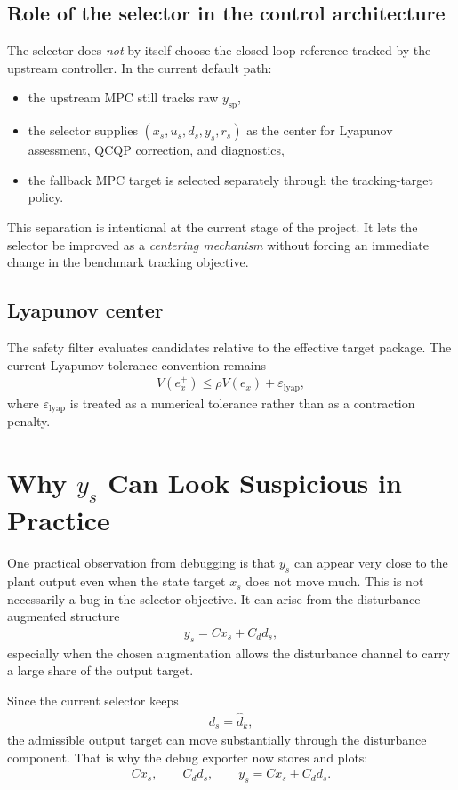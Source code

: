 \documentclass[11pt]{article}
\begin{document}
\subsection{Role of the selector in the control architecture}
The selector does \emph{not} by itself choose the closed-loop reference tracked by the upstream controller. In the current default path:
\begin{itemize}
\item the upstream MPC still tracks raw $y_{\mathrm{sp}}$,
\item the selector supplies $(x_s,u_s,d_s,y_s,r_s)$ as the center for Lyapunov assessment, QCQP correction, and diagnostics,
\item the fallback MPC target is selected separately through the tracking-target policy.
\end{itemize}

This separation is intentional at the current stage of the project. It lets the selector be improved as a \emph{centering mechanism} without forcing an immediate change in the benchmark tracking objective.

\subsection{Lyapunov center}
The safety filter evaluates candidates relative to the effective target package. The current Lyapunov tolerance convention remains
\begin{align}
V(e_x^+) \le \rho V(e_x) + \varepsilon_{\mathrm{lyap}},
\end{align}
where $\varepsilon_{\mathrm{lyap}}$ is treated as a numerical tolerance rather than as a contraction penalty.

\section{Why $y_s$ Can Look Suspicious in Practice}
One practical observation from debugging is that $y_s$ can appear very close to the plant output even when the state target $x_s$ does not move much. This is not necessarily a bug in the selector objective. It can arise from the disturbance-augmented structure
\begin{align}
y_s = C x_s + C_d d_s,
\end{align}
especially when the chosen augmentation allows the disturbance channel to carry a large share of the output target.

Since the current selector keeps
\begin{align}
d_s = \hat d_k,
\end{align}
the admissible output target can move substantially through the disturbance component. That is why the debug exporter now stores and plots:
\begin{align}
C x_s,\qquad C_d d_s,\qquad y_s = C x_s + C_d d_s.
\end{align}
\end{document}
